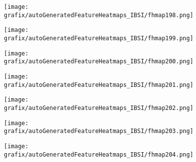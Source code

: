 \hspace{\hsp} 
\begin{subfigure}{\wid\textwidth} 
    \centering 
    \caption{\tiny \sffamily {}} 
    \vspace{\vsp} 
    \texttt{[image: grafix/autoGeneratedFeatureHeatmaps\_IBSI/fhmap198.png]} 
\end{subfigure} 
\hspace{\hsp} 
\begin{subfigure}{\wid\textwidth} 
    \centering 
    \caption{\tiny \sffamily {}} 
    \vspace{\vsp} 
    \texttt{[image: grafix/autoGeneratedFeatureHeatmaps\_IBSI/fhmap199.png]} 
\end{subfigure} 
\hspace{\hsp} 
\begin{subfigure}{\wid\textwidth} 
    \centering 
    \caption{\tiny \sffamily {}} 
    \vspace{\vsp} 
    \texttt{[image: grafix/autoGeneratedFeatureHeatmaps\_IBSI/fhmap200.png]} 
\end{subfigure} 
\hspace{\hsp} 
\begin{subfigure}{\wid\textwidth} 
    \centering 
    \caption{\tiny \sffamily {}} 
    \vspace{\vsp} 
    \texttt{[image: grafix/autoGeneratedFeatureHeatmaps\_IBSI/fhmap201.png]} 
\end{subfigure} 
\hspace{\hsp} 
\begin{subfigure}{\wid\textwidth} 
    \centering 
    \caption{\tiny \sffamily {}} 
    \vspace{\vsp} 
    \texttt{[image: grafix/autoGeneratedFeatureHeatmaps\_IBSI/fhmap202.png]} 
\end{subfigure} 
\hspace{\hsp} 
\begin{subfigure}{\wid\textwidth} 
    \centering 
    \caption{\tiny \sffamily {}} 
    \vspace{\vsp} 
    \texttt{[image: grafix/autoGeneratedFeatureHeatmaps\_IBSI/fhmap203.png]} 
\end{subfigure} 
\hspace{\hsp} 
\begin{subfigure}{\wid\textwidth} 
    \centering 
    \caption{\tiny \sffamily {}} 
    \vspace{\vsp} 
    \texttt{[image: grafix/autoGeneratedFeatureHeatmaps\_IBSI/fhmap204.png]} 
\end{subfigure} 
